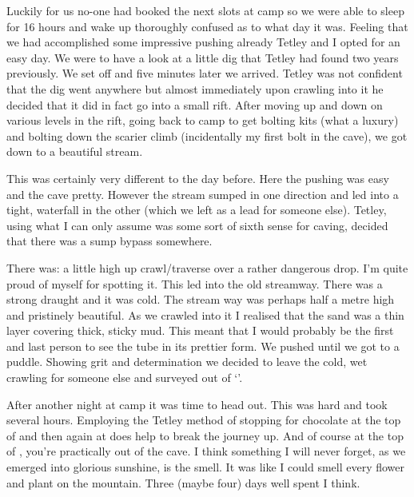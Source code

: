 
Luckily for us no-one had booked the next slots at camp so we were able to sleep for 16 hours and wake up thoroughly confused as to what day it was. Feeling that we had accomplished some impressive pushing already Tetley and I opted for an easy day. We were to have a look at a little dig that Tetley had found two years previously. We set off and five minutes later we arrived. Tetley was not confident that the dig went anywhere but almost immediately upon crawling into it he decided that it did in fact go into a small rift. After moving up and down on various levels in the rift, going back to camp to get bolting kits (what a luxury) and bolting down the scarier climb (incidentally my first bolt in the cave), we got down to a beautiful stream.

This was certainly very different to the day before. Here the pushing was easy and the cave pretty. However the stream sumped in one direction and led into a tight, waterfall in the other (which we left as a lead for someone else). Tetley, using what I can only assume was some sort of sixth sense for caving, decided that there was a sump bypass somewhere.




There was: a little high up crawl/traverse over a rather dangerous drop. I’m quite proud of myself for spotting it. This led into the old streamway. There was a strong draught and it was cold. The stream way was perhaps half a metre high and pristinely beautiful. As we crawled into it I realised that the sand was a thin layer covering thick, sticky mud. This meant that I would probably be the first and last person to see the tube in its prettier form. We pushed until we got to a puddle. Showing grit and determination we decided to leave the cold, wet crawling for someone else and surveyed out of ‘’.


After another night at camp it was time to head out. This was hard and took several hours. Employing the Tetley method of stopping for chocolate at the top of  and then again at  does help to break the journey up. And of course at the top of , you’re practically out of the cave. I think something I will never forget, as we emerged into glorious sunshine, is the smell. It was like I could smell every flower and plant on the mountain. Three (maybe four) days well spent I think.


